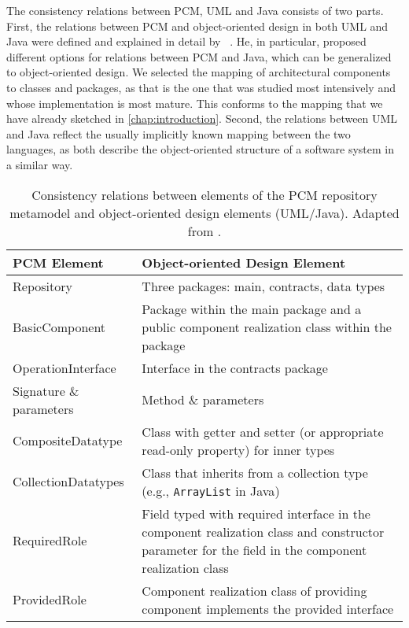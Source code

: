 The consistency relations between \gls{PCM}, \gls{UML} and Java consists of two parts.
First, the relations between \gls{PCM} and object-oriented design in both \gls{UML} and Java were defined and explained in detail by \citeauthor{langhammer2017a}~\cite{langhammer2015a, langhammer2017a}.
He, in particular, proposed different options for relations between \gls{PCM} and Java, which can be generalized to object-oriented design.
We selected the mapping of architectural components to classes and packages, as that is the one that was studied most intensively and whose implementation is most mature.
This conforms to the mapping that we have already sketched in \autoref{chap:introduction}.
Second, the relations between \gls{UML} and Java reflect the usually implicitly known mapping between the two languages, as both describe the object-oriented structure of a software system in a similar way.

\begin{table}
	\centering 
    \small
    \renewcommand{\arraystretch}{1.4}
	\begin{tabular}{p{3.2cm} p{6.6cm}}
		\toprule
        \textbf{\gls{PCM} Element}  & \textbf{Object-oriented Design Element} \\
        \midrule
		Repository              & Three packages: main, contracts, data types\\
		BasicComponent 		    & Package within the main package and a public component realization class within the package \\
		OperationInterface		& Interface in the contracts package \\
		Signature \& parameters & Method \& parameters \\
		CompositeDatatype       & Class with getter and setter (or appropriate read-only property) for inner types\\
		CollectionDatatypes     & Class that inherits from a collection type (e.g., \texttt{ArrayList} in Java) \\
		RequiredRole		    & Field typed with required interface in the component realization class and constructor parameter for the field in the component realization class\\
		ProvidedRole		    & Component realization class of providing component implements the provided interface\\
		\bottomrule
	\end{tabular}
	\caption[Consistency relations between \acrshort{PCM} and \acrshort{UML}/Java]{Consistency relations between elements of the \gls{PCM} repository metamodel and object-oriented design elements (\gls{UML}/Java). Adapted from \cite[Table 4.1]{langhammer2017a}.}
	\label{tab:foundations:pcm_oo_rules}
\end{table}

